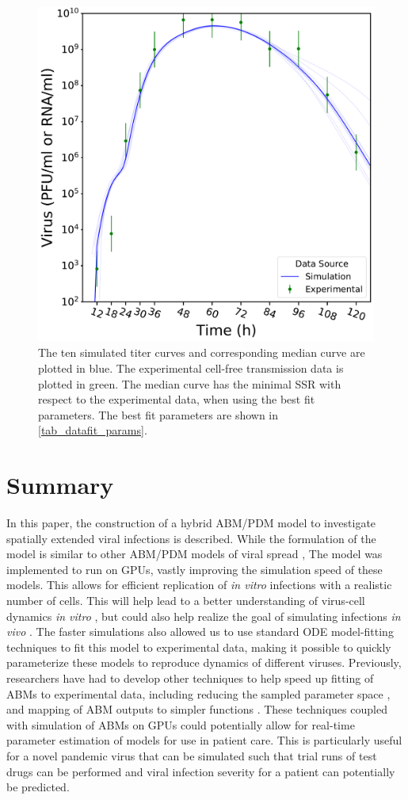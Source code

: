 \begin{figure}
\centering
    \includegraphics[width=0.6\linewidth]{Figures/DataFit.pdf}
\caption{The ten simulated titer curves and corresponding median curve are plotted in blue. The experimental cell-free transmission data \citep{pinilla12} is plotted in green. The median curve has the minimal SSR with respect to the experimental data, when using the best fit parameters. The best fit parameters are shown in \ref{tab_datafit_params}. \label{fig_DataFit}}
\end{figure}

\section{Summary}

In this paper, the construction of a hybrid ABM/PDM model to investigate spatially extended viral infections is described. While the formulation of the model is similar to other ABM/PDM models of viral spread \citep{beauchemin_simple_2005, bauer_agent-based_2009}, The model was implemented to run on GPUs, vastly improving the simulation speed of these models. This allows for efficient replication of \emph{in vitro} infections with a realistic number of cells. This will help lead to a better understanding of virus-cell dynamics \emph{in vitro} \citep{blahut21}, but could also help realize the goal of simulating infections \emph{in vivo} \citep{laubenbacher21}. The faster simulations also allowed us to use standard ODE model-fitting techniques to fit this model to experimental data, making it possible to quickly parameterize these models to reproduce dynamics of different viruses. Previously, researchers have had to develop other techniques to help speed up fitting of ABMs to experimental data, including reducing the sampled parameter space \citep{li17}, and mapping of ABM outputs to simpler functions \citep{tong_development_2015, read16}. These techniques coupled with simulation of ABMs on GPUs could potentially allow for real-time parameter estimation of models for use in patient care. This is particularly useful for a novel pandemic virus that can be simulated such that trial runs of test drugs can be performed and viral infection severity for a patient can potentially be predicted.




